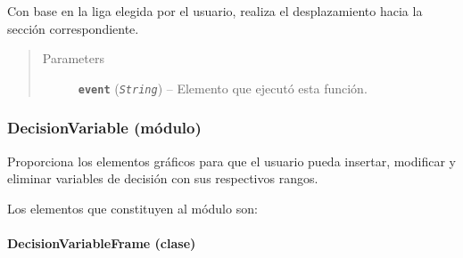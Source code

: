 \documentclass[letterpaper,10pt,english]{sphinxmanual}
\begin{document}
\begin{fulllineitems}
\begin{fulllineitems}
Con base en la liga elegida por el usuario, realiza el
desplazamiento hacia la sección correspondiente.
\begin{quote}\begin{description}
\item[{Parameters}] \leavevmode
\textbf{\texttt{event}} (\emph{\texttt{String}}) -- Elemento que ejecutó esta función.

\end{description}\end{quote}

\end{fulllineitems}


\end{fulllineitems}



\subsubsection{DecisionVariable (módulo)}
\label{View/Main/DecisionVariable/DecisionVariable:decisionvariable-modulo}\label{View/Main/DecisionVariable/DecisionVariable::doc}
Proporciona los elementos gráficos para que el usuario pueda
insertar, modificar y eliminar variables de decisión con sus respectivos
rangos.

Los elementos que constituyen al módulo son:


\paragraph{DecisionVariableFrame (clase)}
\label{View/Main/DecisionVariable/DecisionVariableFrame:module-View.Main.DecisionVariable.DecisionVariableFrame}\label{View/Main/DecisionVariable/DecisionVariableFrame:decisionvariableframe-clase}\label{View/Main/DecisionVariable/DecisionVariableFrame::doc}
\end{document}

